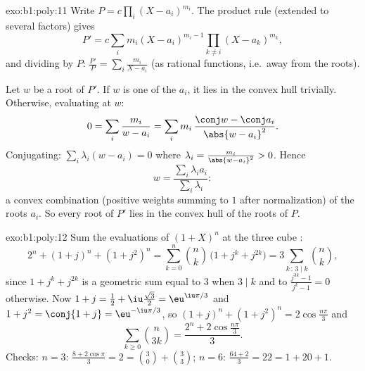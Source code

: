 \begin{solution}{exo:b1:poly:11}
Write $P = c\prod_i (X - a_i)^{m_i}$. The product rule (extended to
several factors) gives
\[
P' = c\sum_{i} m_i (X - a_i)^{m_i - 1} \prod_{k \neq i} (X -
a_k)^{m_k},
\]
and dividing by $P$: $\frac{P'}{P} = \sum_i \frac{m_i}{X - a_i}$
(as rational functions, i.e.\ away from the roots).

Let $w$ be a root of $P'$. If $w$ is one of the $a_i$, it lies in the
convex hull trivially. Otherwise, evaluating at $w$:
\[
0 = \sum_i \frac{m_i}{w - a_i}
= \sum_i m_i\, \frac{\conj w - \conj a_i}{\abs{w - a_i}^2} .
\]
Conjugating: $\sum_i \lambda_i (w - a_i) = 0$ where $\lambda_i =
\frac{m_i}{\abs{w - a_i}^2} > 0$. Hence
\[
w = \frac{\sum_i \lambda_i a_i}{\sum_i \lambda_i} :
\]
a convex combination (positive weights summing to $1$ after
normalization) of the roots $a_i$. So every root of $P'$ lies in the
convex hull of the roots of $P$.
\end{solution}

\begin{solution}{exo:b1:poly:12}
Sum the evaluations of $(1 + X)^n$ at the three cube :
\[
2^n + (1 + j)^n + (1 + j^2)^n
= \sum_{k=0}^n \binom nk\,\bigl(1 + j^k + j^{2k}\bigr)
= 3\sum_{k\,:\,3\mid k}\binom nk ,
\]
since $1 + j^k + j^{2k}$ is a geometric sum equal to $3$ when $3
\mid k$ and to $\frac{j^{3k} - 1}{j^k - 1} = 0$ otherwise. Now $1 +
j = \frac12 + \iu\frac{\sqrt3}2 = \eu^{\iu\pi/3}$ and $1 + j^2 =
\conj{1 + j} = \eu^{-\iu\pi/3}$, so $(1+j)^n + (1+j^2)^n =
2\cos\frac{n\pi}3$ and
\[
\sum_{k\geq0}\binom n{3k} = \frac{2^n + 2\cos\frac{n\pi}3}{3} .
\]
Checks: $n = 3$: $\frac{8 + 2\cos\pi}3 = 2 = \binom30 + \binom33$;
$n = 6$: $\frac{64 + 2}3 = 22 = 1 + 20 + 1$.
\end{solution}

